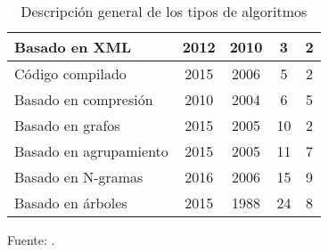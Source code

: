 \begin{table}[H]
\begin{tabular}{|lllll|}
\multicolumn{1}{|l|}{Basado en XML}           & \multicolumn{1}{c|}{2012}       & \multicolumn{1}{c|}{2010}       & \multicolumn{1}{c|}{3}                 & \multicolumn{1}{c|}{2}            \\ \hline
\multicolumn{1}{|l|}{Código compilado}        & \multicolumn{1}{c|}{2015}       & \multicolumn{1}{c|}{2006}       & \multicolumn{1}{c|}{5}                 & \multicolumn{1}{c|}{2}            \\ \hline
\multicolumn{1}{|l|}{Basado en compresión}    & \multicolumn{1}{c|}{2010}       & \multicolumn{1}{c|}{2004}       & \multicolumn{1}{c|}{6}                 & \multicolumn{1}{c|}{5}            \\ \hline
\multicolumn{1}{|l|}{Basado en grafos}        & \multicolumn{1}{c|}{2015}       & \multicolumn{1}{c|}{2005}       & \multicolumn{1}{c|}{10}                & \multicolumn{1}{c|}{2}            \\ \hline
\multicolumn{1}{|l|}{Basado en agrupamiento}  & \multicolumn{1}{c|}{2015}       & \multicolumn{1}{c|}{2005}       & \multicolumn{1}{c|}{11}                & \multicolumn{1}{c|}{7}            \\ \hline
\multicolumn{1}{|l|}{Basado en N-gramas}      & \multicolumn{1}{c|}{2016}       & \multicolumn{1}{c|}{2006}       & \multicolumn{1}{c|}{15}                & \multicolumn{1}{c|}{9}            \\ \hline
\multicolumn{1}{|l|}{Basado en árboles}       & \multicolumn{1}{c|}{2015}       & \multicolumn{1}{c|}{1988}       & \multicolumn{1}{c|}{24}                & \multicolumn{1}{c|}{8}            \\ \hline
\end{tabular}
\caption{Descripción general de los tipos de algoritmos}
Fuente: \cite{Novak2019}.
\label{tiposDeAlgoritmos}
\end{table}

